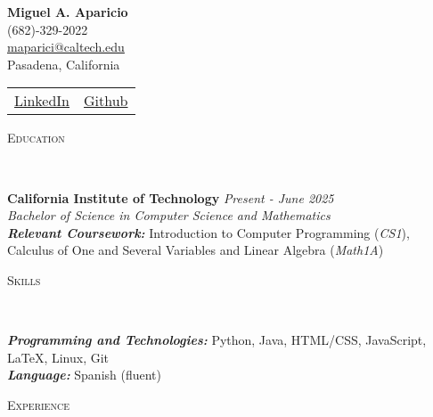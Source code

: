 \documentclass[letterpaper,11pt]{article}
\newcommand{\lineover}{ 
          \begin{changemargin}{-0.05in}{-0.05in} 
                  \vspace*{-8pt} 
                \hrulefill \\ 
                  \vspace*{-2pt} 
        \end{changemargin} 
}
\newenvironment{changemargin}[2]{%
    \begin{list}{}{%
      \setlength{\topsep}{0pt}%
      \setlength{\leftmargin}{0}%
      \setlength{\rightmargin}{#2}%
      \setlength{\listparindent}{\parindent}%
      \setlength{\itemindent}{\parindent}%
      \setlength{\parsep}{\parskip}%
    }%
  \item[]}{\end{list} 
}
\newcommand{\header}[1]{ 
          \begin{changemargin}{-0.5in}{-0.5in} 
                  \scshape{#1}\\ 
        \lineover 
        \end{changemargin} 
}
\newenvironment{body} { 
          \vspace*{-16pt} 
          \begin{changemargin}{-0.25in}{-0.5in} 
    }      
          {\end{changemargin} 
  }
\begin{document}
 
   
   
  {\Large \textbf{Miguel A. Aparicio}} \\ 
  (682)-329-2022 \\ 
  \href{mailto:maparici@caltech.edu}{maparici@caltech.edu} \\ 
   Pasadena, California \\ 
 \begin{tabular}{l|l} 
\href{https://www.linkedin.com/in/miguel-angel-aparicio-9a681a1a3/}{LinkedIn } & \href{https://github  .com/jar0ch0}{ Github}  
  \end{tabular} 
  
   
  \header{Education} 
   
  \begin{body} 
          \vspace{14pt} 
        \textbf{California Institute of Technology} \hfill \emph{Present - June 2025} \\ 
          \emph{Bachelor of Science in Computer Science and Mathematics}\\ 
	  \emph{\textbf{Relevant Coursework:}} Introduction to Computer Programming (\textit{CS1}), Calculus of One and Several Variables and Linear Algebra (\textit{Math1A}) 

           
  \end{body} 
   
   
  \header{Skills} 
   
  \begin{body} 
          \vspace{14pt} 
         \emph{\textbf{Programming and Technologies:}}{} Python, Java, HTML/CSS, JavaScript, \LaTeX, Linux, Git\\  
         \medskip 
         \emph{\textbf{Language:}} Spanish (fluent)\\ 
  \end{body} 
   
   
  \header{Experience} 
   
\end{document}
